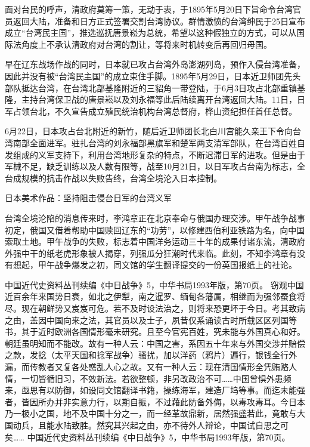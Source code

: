 \documentclass[12pt,UTF8]{ctexbook}
\begin{document}
面对台民的呼声，清政府莫筹一策，无动于衷，于1895年5月20日下旨命令台湾官员返回大陆，准备和日方正式签署交割台湾协议。群情激愤的台湾绅民于25日宣布成立“台湾民主国”，推选巡抚唐景崧为总统，希望以这种假独立的方式，可以从国际法角度上不承认清政府对台湾的割让，等将来时机转变后再回归母国。

早在辽东战场作战的同时，日本就已攻占台湾外岛澎湖列岛，预作入侵台湾准备，因此并没有被“台湾民主国”的成立束住手脚。1895年5月29日，日本近卫师团先头部队抵达台湾，在台湾北部基隆附近的三貂角一带登陆，于6月3日攻占北部重镇基隆，主持台湾保卫战的唐景崧以及刘永福等此后陆续离开台湾返回大陆。11日，日军占领台北，不久宣告成立殖民统治机构台湾总督府，桦山资纪担任首任总督。

6月22日，日本攻占台北附近的新竹，随后近卫师团长北白川宫能久亲王下令向台湾南部全面进军。驻扎台湾的刘永福部黑旗军和楚军两支清军部队，在台湾百姓自发组成的义军支持下，利用台湾地形复杂的特点，不断迟滞日军的进攻。但是由于军械不足，缺乏训练以及人数有限等，战至10月21日，以日军攻占台南为标志，全台成规模的抗击作战以失败告终，台湾全境沦入日本控制。


日本美术作品：坚持阻击侵台日军的台湾义军

台湾全境沦陷的消息传来时，李鸿章正在北京奉命与俄国办理交涉。甲午战争战事初定，俄国又借着帮助中国赎回辽东的“功劳”，以修建西伯利亚铁路为名，向中国索取土地。甲午战争的失败，标志着中国洋务运动三十年的成果付诸东流，清政府外强中干的纸老虎形象被人揭穿，列强瓜分狂潮时代来临。此刻，不知李鸿章有没有想起，甲午战争爆发之初，同文馆的学生翻译提交的一份英国报纸上的社论。

中国近代史资料丛刊续编《中日战争》5，中华书局1993年版，第70页。
窃观中国近百余年来国势日衰，如北之伊犁，南之暹罗、缅甸各藩属，相继而为强邻蚕食将尽。现在朝鲜势又岌岌可危。若不及时设法治之，则将来恐更坏于今日。考其致病之由，盖因中国向来之法，其官员以及士子，夙昔仅系诵读古时所载区区列国等书，其于近时欧洲各国情形毫未研究。且至今官宪百姓，究未能与外国真心和好。朝廷虽明知而不能改。故有一种人云：中国之害，系因五十年来与外国交涉并赔偿之款，发捻（太平天国和捻军战争）骚扰，加以洋药（鸦片）遍行，银钱全行外漏，而传教者又复各处惑乱人心之故。又有一种人云：现在清国情形全凭贿赂人情，一切皆循旧习，不效新法。若欲整顿，非另改政治不可……中国曾惧外患频来，亟思有以防御，如设同文馆翻译书籍，操练海军，建造厂坞等事。而迄未能强者，皆因所办并非实意力行，以期自振，不过藉此防备外侮，以毒攻毒耳。今日本乃一极小之国，地不及中国十分之一，而一经革故鼎新，居然强盛若此，竟敢与大国动兵，且能水陆致胜。然究其兴起之由，亦不待外人辩论，中国试自思之可矣…… 中国近代史资料丛刊续编《中日战争》5，中华书局1993年版，第70页。
\end{document}
